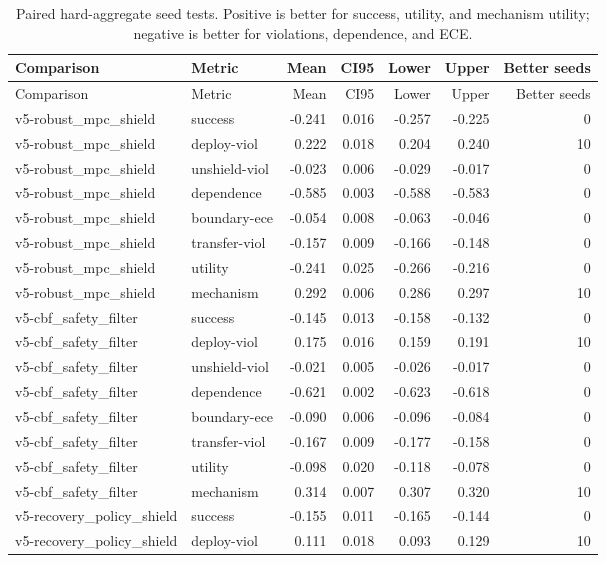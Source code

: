 \documentclass{article}
\begin{document}
\begingroup
\scriptsize
\begin{longtable}{@{}llrrrrr@{}}
\caption{Paired hard-aggregate seed tests. Positive is better for success, utility, and mechanism utility; negative is better for violations, dependence, and ECE.}\\
\toprule
Comparison & Metric & Mean & CI95 & Lower & Upper & Better seeds \\
\midrule
\endfirsthead
\toprule
Comparison & Metric & Mean & CI95 & Lower & Upper & Better seeds \\
\midrule
\endhead
v5-robust\_mpc\_shield & success & -0.241 & 0.016 & -0.257 & -0.225 & 0 \\
v5-robust\_mpc\_shield & deploy-viol & 0.222 & 0.018 & 0.204 & 0.240 & 10 \\
v5-robust\_mpc\_shield & unshield-viol & -0.023 & 0.006 & -0.029 & -0.017 & 0 \\
v5-robust\_mpc\_shield & dependence & -0.585 & 0.003 & -0.588 & -0.583 & 0 \\
v5-robust\_mpc\_shield & boundary-ece & -0.054 & 0.008 & -0.063 & -0.046 & 0 \\
v5-robust\_mpc\_shield & transfer-viol & -0.157 & 0.009 & -0.166 & -0.148 & 0 \\
v5-robust\_mpc\_shield & utility & -0.241 & 0.025 & -0.266 & -0.216 & 0 \\
v5-robust\_mpc\_shield & mechanism & 0.292 & 0.006 & 0.286 & 0.297 & 10 \\
v5-cbf\_safety\_filter & success & -0.145 & 0.013 & -0.158 & -0.132 & 0 \\
v5-cbf\_safety\_filter & deploy-viol & 0.175 & 0.016 & 0.159 & 0.191 & 10 \\
v5-cbf\_safety\_filter & unshield-viol & -0.021 & 0.005 & -0.026 & -0.017 & 0 \\
v5-cbf\_safety\_filter & dependence & -0.621 & 0.002 & -0.623 & -0.618 & 0 \\
v5-cbf\_safety\_filter & boundary-ece & -0.090 & 0.006 & -0.096 & -0.084 & 0 \\
v5-cbf\_safety\_filter & transfer-viol & -0.167 & 0.009 & -0.177 & -0.158 & 0 \\
v5-cbf\_safety\_filter & utility & -0.098 & 0.020 & -0.118 & -0.078 & 0 \\
v5-cbf\_safety\_filter & mechanism & 0.314 & 0.007 & 0.307 & 0.320 & 10 \\
v5-recovery\_policy\_shield & success & -0.155 & 0.011 & -0.165 & -0.144 & 0 \\
v5-recovery\_policy\_shield & deploy-viol & 0.111 & 0.018 & 0.093 & 0.129 & 10 \\

\end{longtable}
\end{document}
